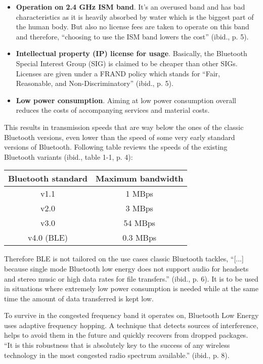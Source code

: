 \begin{itemize}
    \item \textbf{Operation on 2.4 GHz ISM band}. It's an overused band and has bad characteristics as it is heavily absorbed by water which is the biggest part of the human body. But also no license fees are taken to operate on this band and therefore, \enquote{choosing to use the ISM band lowers the cost} (ibid., p. 5).
    \item \textbf{Intellectual property (IP) license for usage}. Basically, the Bluetooth Special Interest Group (SIG) is claimed to be cheaper than other SIGs. Licenses are given under a FRAND policy which stands for \enquote{Fair, Reasonable, and Non-Discriminatory} (ibid., p. 5).
    \item \textbf{Low power consumption}. Aiming at low power consumption overall reduces the costs of accompanying services and material costs.
\end{itemize}

This results in transmission speeds that are way below the ones of the classic Bluetooth versions, even lower than the speed of some very early standard versions of Bluetooth. Following table reviews the speeds of the existing Bluetooth variants (ibid., table 1-1, p. 4):

\begin{center}

    \begin{tabular}{ c | c }
        \textbf{Bluetooth standard} &   \textbf{Maximum bandwidth} \\
        \hline
        v1.1                        &   1 MBps \\
        v2.0                        &   3 MBps \\
        v3.0                        &   54 MBps \\
        v4.0 (BLE)                  &   0.3 MBps
    \end{tabular}

\end{center}

Therefore BLE is not tailored on the use cases classic Bluetooth tackles, \enquote{[...] because single mode Bluetooth low energy does not support audio for headsets and stereo music or high data rates for file transfers.} (ibid., p. 6). It is to be used in situations where extremely low power consumption is needed while at the same time the amount of data transferred is kept low.

To survive in the congested frequency band it operates on, Bluetooth Low Energy uses adaptive frequency hopping. A technique that detects sources of interference, helps to avoid them in the future and quickly recovers from dropped packages. \enquote{It is this robustness that is absolutely key to the success of any wireless technology in the most congested radio spectrum available.} (ibid., p. 8).

